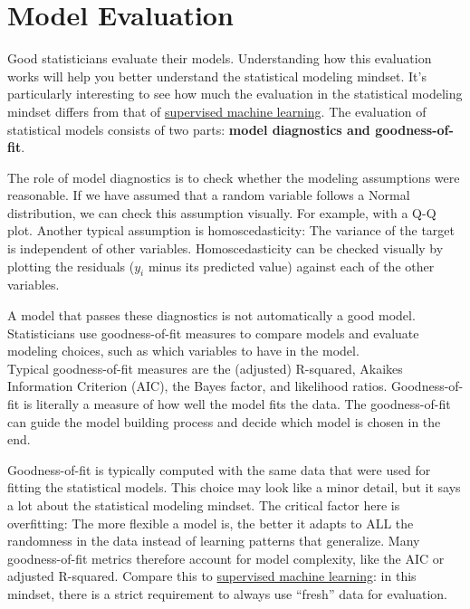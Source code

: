 \documentclass[
  10pt,
]{scrbook}
\begin{document}
\hypertarget{model-evaluation}{%
\section{Model Evaluation}\label{model-evaluation}}

Good statisticians evaluate their models.
Understanding how this evaluation works will help you better understand the statistical modeling mindset.
It's particularly interesting to see how much the evaluation in the statistical modeling mindset differs from that of \protect\hyperlink{supervised-ml}{supervised machine learning}.
The evaluation of statistical models consists of two parts: \textbf{model diagnostics and goodness-of-fit}.

The role of model diagnostics is to check whether the modeling assumptions were reasonable.
If we have assumed that a random variable follows a Normal distribution, we can check this assumption visually.
For example, with a Q-Q plot.
Another typical assumption is homoscedasticity: The variance of the target is independent of other variables.
Homoscedasticity can be checked visually by plotting the residuals (\(y_i\) minus its predicted value) against each of the other variables.

A model that passes these diagnostics is not automatically a good model.
Statisticians use goodness-of-fit measures to compare models and evaluate modeling choices, such as which variables to have in the model.\\
Typical goodness-of-fit measures are the (adjusted) R-squared, Akaikes Information Criterion (AIC), the Bayes factor, and likelihood ratios.
Goodness-of-fit is literally a measure of how well the model fits the data.
The goodness-of-fit can guide the model building process and decide which model is chosen in the end.

Goodness-of-fit is typically computed with the same data that were used for fitting the statistical models.
This choice may look like a minor detail, but it says a lot about the statistical modeling mindset.
The critical factor here is overfitting: The more flexible a model is, the better it adapts to ALL the randomness in the data instead of learning patterns that generalize.
Many goodness-of-fit metrics therefore account for model complexity, like the AIC or adjusted R-squared.
Compare this to \protect\hyperlink{supervised-ml}{supervised machine learning}: in this mindset, there is a strict requirement to always use ``fresh'' data for evaluation.
\end{document}
